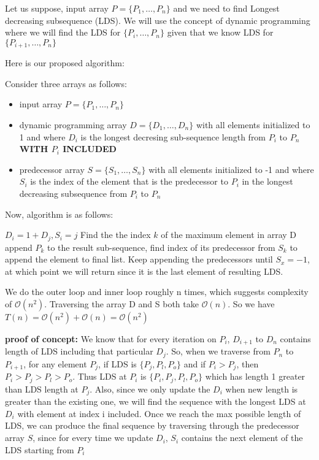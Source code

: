 \documentclass[11pt]{article}
\renewcommand{\O}{\mathcal{O}}
\begin{document}
Let us suppose, input array $P = \{P_1, \dots, P_n\}$ and we need to find Longest decreasing subsequence (LDS). 
We will use the concept of dynamic programming where we will find the LDS for $\{P_i, \dots, P_n\}$ 
given that we know LDS for $\{P_{i+1}, \dots, P_n\}$

\noindent Here is our proposed algorithm:


\noindent Consider three arrays as follows:

\begin{itemize}
\item input array $P = \{P_1, \dots, P_n\}$
\item dynamic programming array $D = \{D_1, \dots, D_n\}$ with all elements initialized to 1 and
where $D_i$ is the longest decresing sub-sequence length from $P_i$ to $P_n$ {\bf WITH $P_i$ INCLUDED}
\item predecessor array $S = \{S_1, \dots, S_n\}$  with all elements initialized to -1 and
where $S_i$ is the index of the element that is the predecessor to $P_i$ in the longest
decreasing subsequence from $P_i$ to $P_n$
\end{itemize}

\noindent Now, algorithm is as follows:

\begin{algorithm}
\begin{algorithmic}
        \State$D_i = 1 + D_j, S_i = j$
      \EndIf
    \EndFor
  \EndFor
  \State Find the the index $k$ of the maximum element in array D
  \State append $P_k$ to the result sub-sequence, find index of its predecessor from $S_k$ to append the element to final list. Keep appending the predecessors until $S_x = -1$, at which point we will return since it is the last element of resulting LDS.
\end{algorithmic}
\end{algorithm}

 We do the outer loop and inner loop roughly n times, which suggests complexity of $\O(n^2)$. Traversing the array D and S both take $\O(n)$. So we have $T(n) = \O(n^2) + \O(n) = \O(n^2)$


{\bf proof of concept:}
We know that for every iteration on $P_i$, $D_{i+1}$ to $D_n$ contains length of LDS including that particular $D_j$.
So, when we traverse from $P_n$ to $P_{i+1}$, for any element $P_j$, if LDS is $\{P_j, P_l, P_o\}$ and if $P_i > P_j$, then $P_i > P_j > P_l > P_o$.
Thus LDS at $P_i$ is $\{P_i, P_j, P_l, P_o\}$ which has length 1 greater than LDS length at $P_j$. 
Also, since we only update the $D_i$ when new length is greater than the existing one, we will find the sequence with the longest LDS at $D_i$ with element at index i included.
Once we reach the max possible length of LDS, we can produce the final sequence by traversing through the predecessor array $S$, since for every time we update $D_i$, $S_i$ contains the next element of the LDS starting from $P_i$
 
\end{document}
